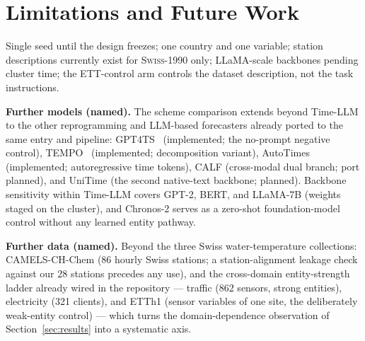 \documentclass[sigconf,review]{acmart}
\newcommand{\swiss}{\textsc{Swiss-1990}}
\begin{document}
\section{Limitations and Future Work}
Single seed until the design freezes; one country and one variable; station
descriptions currently exist for \swiss{} only; LLaMA-scale backbones pending
cluster time; the ETT-control arm controls the dataset description, not the task
instructions.

\textbf{Further models (named).} The scheme comparison extends beyond Time-LLM to
the other reprogramming and LLM-based forecasters already ported to the same entry
and pipeline: GPT4TS~\cite{zhou2023onefitsall} (implemented; the no-prompt negative
control), TEMPO~\cite{cao2024tempo} (implemented; decomposition variant),
AutoTimes~\cite{liu2024autotimes} (implemented; autoregressive time tokens),
CALF (cross-modal dual branch; port planned), and UniTime (the second
native-text backbone; planned). Backbone sensitivity within Time-LLM covers GPT-2,
BERT, and LLaMA-7B (weights staged on the cluster), and Chronos-2 serves as a
zero-shot foundation-model control without any learned entity pathway.

\textbf{Further data (named).} Beyond the three Swiss water-temperature
collections: CAMELS-CH-Chem (86 hourly Swiss stations; a station-alignment
leakage check against our 28 stations precedes any use), and the cross-domain
entity-strength ladder already wired in the repository --- traffic (862 sensors,
strong entities), electricity (321 clients), and ETTh1 (sensor variables of one
site, the deliberately weak-entity control) --- which turns the domain-dependence
observation of Section~\ref{sec:results} into a systematic axis.
\end{document}
